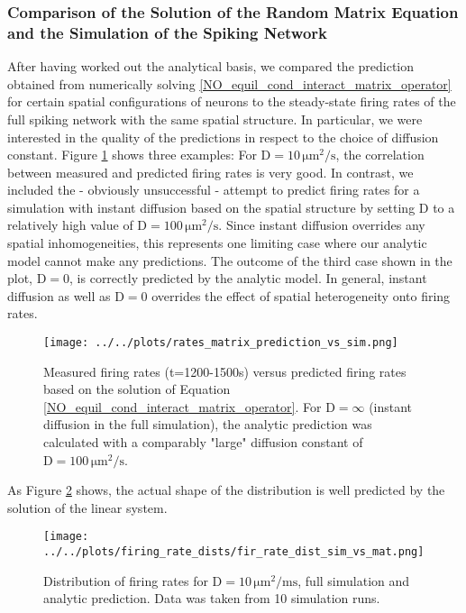 \documentclass[10pt,a4paper]{article}
\begin{document}
\subsubsection{Comparison of the Solution of the Random Matrix Equation and the Simulation of the Spiking Network}\label{Section_Rand_Mat_vs_Sim}
After having worked out the analytical basis, we compared the prediction obtained from numerically solving \eqref{NO_equil_cond_interact_matrix_operator} for certain spatial configurations of neurons to the steady-state firing rates of the full spiking network with the same spatial structure. In particular, we were interested in the quality of the predictions in respect to the choice of diffusion constant. Figure \ref{Rand_Matrix_Sol_vs_Sim} shows three examples: For $\mathrm{D=10\, \mu m^2 /s}$, the correlation between measured and predicted firing rates is very good. In contrast, we included the - obviously unsuccessful - attempt to predict firing rates for a simulation with instant diffusion based on the spatial structure by setting D to a relatively high value of $\mathrm{D=100\, \mu m^2 /s}$. Since instant diffusion overrides any spatial inhomogeneities, this represents one limiting case where our analytic model cannot make any predictions. The outcome of the third case shown in the plot, $\mathrm{D=0}$, is correctly predicted by the analytic model. In general, instant diffusion as well as $\mathrm{D=0}$ overrides the effect of spatial heterogeneity onto firing rates. 
\begin{figure}
\texttt{[image: ../../plots/rates\_matrix\_prediction\_vs\_sim.png]}
\caption{Measured firing rates (t=1200-1500s) versus predicted firing rates based on the solution of Equation \eqref{NO_equil_cond_interact_matrix_operator}. For $\mathrm{D=\infty}$ (instant diffusion in the full simulation), the analytic prediction was calculated with a comparably "large" diffusion constant of $\mathrm{D=100\, \mu m^2 /s}$.}
\label{Rand_Matrix_Sol_vs_Sim}
\end{figure}
As Figure \ref{Fir_Rate_Dist_Sim_vs_Mat} shows, the actual shape of the distribution is well predicted by the solution of the linear system.
\begin{figure}
\begin{center}
\texttt{[image: ../../plots/firing\_rate\_dists/fir\_rate\_dist\_sim\_vs\_mat.png]}
\end{center}
\caption{Distribution of firing rates for $\mathrm{D=10\, \mu m^2 / ms}$, full simulation and analytic prediction. Data was taken from 10 simulation runs.}
\label{Fir_Rate_Dist_Sim_vs_Mat}
\end{figure}
\end{document}
